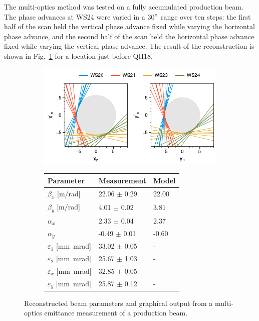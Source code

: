 The multi-optics method was tested on a fully accumulated production beam. The phase advances at WS24 were varied in a 30$\degree$ range over ten steps: the first half of the scan held the vertical phase advance fixed while varying the horizontal phase advance, and the second half of the scan held the horizontal phase advance fixed while varying the vertical phase advance. The result of the reconstruction is shown in Fig.~\ref{fig:prod_meas} for a location just before QH18.
%
\begin{figure}[!p]
    \centering
    \begin{subfigure}{0.9\textwidth}
        \centering
        \includegraphics[width=\textwidth]{Images/chapter4/prod_meas_lines.pdf}  
    \end{subfigure}
    \par\medskip
    \begin{subfigure}{0.6\textwidth}
        \centering
        \begin{tabular}{lll}
            \small\textbf{Parameter} & \small\textbf{Measurement} & \small\textbf{Model} \\
            \midrule
            \small$\beta_x$ [m/rad] & \small22.06 $\pm$ 0.29 & \small22.00 \\
            \small$\beta_y$ [m/rad] & \small4.01 $\pm$ 0.02 & \small3.81 \\
            \small$\alpha_x$ & \small2.33 $\pm$ 0.04 & \small2.37 \\
            \small$\alpha_y$ & \small-0.49 $\pm$ 0.01 & \small-0.60 \\
            \small$\varepsilon_1$ [mm~mrad] & \small33.02 $\pm$ \small0.05 & - \\
            \small$\varepsilon_2$ [mm~mrad] & \small25.67 $\pm$ \small1.03 & - \\
            \small$\varepsilon_x$ [mm~mrad] & \small32.85 $\pm$ \small0.05 & - \\
            \small$\varepsilon_y$ [mm~mrad] & \small25.87 $\pm$ \small0.12 & - \\
          \end{tabular}
    \end{subfigure}
    \par\medskip
    \caption{Reconstructed beam parameters and graphical output from a multi-optics emittance measurement of a production beam.}
    \label{fig:prod_meas}
\end{figure}

